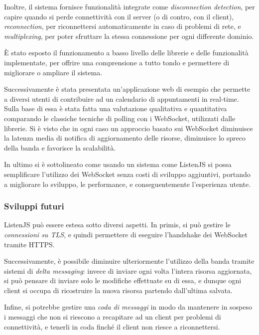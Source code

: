 \documentclass[12pt,a4paper,openright,twoside]{report}
\begin{document}
Inoltre, il sistema fornisce funzionalità integrate come \textit{disconnection detection}, per capire quando si perde connettività con il server (o di contro, con il client), \textit{reconnection}, per riconnettersi automaticamente in caso di problemi di rete, e \textit{multiplexing}, per poter sfruttare la stessa connessione per ogni differente dominio.

È stato esposto il funzionamento a basso livello delle librerie e delle funzionalità implementate, per offrire una comprensione a tutto tondo e permettere di migliorare o ampliare il sistema.

\bigskip

Successivamente è stata presentata un'applicazione web di esempio che permette a diversi utenti di contribuire ad un calendario di appuntamenti in real-time. Sulla base di essa è stata fatta una valutazione qualitativa e quantitativa comparando le classiche tecniche di polling con i WebSocket, utilizzati dalle librerie.  Si è visto che in ogni caso un approccio basato sui WebSocket diminuisce la latenza media di notifica di aggiornamento delle risorse, diminuisce lo spreco della banda e favorisce la scalabilità.

In ultimo si è sottolineato come usando un sistema come ListenJS si possa semplificare l'utilizzo dei WebSocket senza costi di sviluppo aggiuntivi, portando a migliorare lo sviluppo, le performance, e conseguentemente l'esperienza utente.

\subsubsection{Sviluppi futuri}
ListenJS può essere estesa sotto diversi aspetti. In primis, si può gestire le \textit{connessioni su TLS}, e quindi permettere di eseguire l'handshake dei WebSocket tramite HTTPS.

Successivamente, è possibile diminuire ulteriormente l'utilizzo della banda tramite sistemi di \textit{delta messaging}: invece di inviare ogni volta l'intera risorsa aggiornata, si può pensare di inviare solo le modifiche effettuate su di essa, e dunque ogni client si occupa di ricostruire la nuova risorsa partendo dall'ultima salvata.

Infine, si potrebbe gestire una \textit{coda di messaggi} in modo da mantenere in sospeso i messaggi che non si riescono a recapitare ad un client per problemi di connettività, e tenerli in coda finché il client non riesce a riconnettersi.
\clearpage{\pagestyle{empty}\cleardoublepage}




\end{document}
